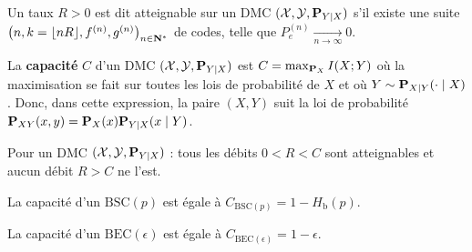 	\begin{defn}
		Un taux $R > 0$ est dit atteignable sur un DMC $(\mathcal{X},\mathcal{Y},\mathbf{P}_{Y \mid X})$ s'il existe une suite $\left( n,k = \lfloor nR \rfloor, f^{(n)}, g^{(n)} \right)_{n \in \mathbf{N}^*}$ de codes, telle que $P_e^{(n)} \underset{n \to \infty}{\longrightarrow} 0$.
	\end{defn}

	\begin{defn}
		La \textbf{capacité} $C$ d'un DMC $(\mathcal{X},\mathcal{Y},\mathbf{P}_{Y \mid X})$ est $C = \max_{\mathbf{P}_X} I(X;Y)$
		où la maximisation se fait sur toutes les lois de probabilité de $X$ et où $Y \sim \mathbf{P}_{X \mid Y}(\cdot \mid X)$.
		Donc, dans cette expression, la paire $(X,Y)$ suit la loi de probabilité $\mathbf{P}_{XY}(x,y) = \mathbf{P}_X(x) \mathbf{P}_{Y \mid X}(x \mid Y)$.
	\end{defn}
	
	\begin{thm}
		Pour un DMC $(\mathcal{X},\mathcal{Y},\mathbf{P}_{Y \mid X})$ : tous les débits $0 < R < C$ sont atteignables et aucun débit $R > C$ ne l'est.
	\end{thm}

	\begin{pop}
		La capacité d'un $\mathrm{BSC}(p)$ est égale à $C_{\mathrm{BSC}(p)} = 1 - H_{\mathrm{b}}(p)$.
	\end{pop}

	\begin{pop}
		La capacité d'un $\mathrm{BEC}(\epsilon)$ est égale à $C_{\mathrm{BEC}(\epsilon)} = 1 - \epsilon$.
	\end{pop}